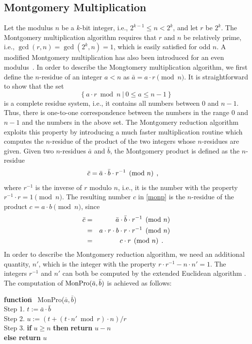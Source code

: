 \documentclass[twocolumn]{svjour3}          %
\begin{document}
\subsection{Montgomery Multiplication}

Let the modulus $n$ be a $k$-bit integer, i.e., $2^{k-1} \leq n < 2^k$,
and let $r$ be $2^k$. The Montgomery multiplication algorithm requires
that $r$ and $n$ be relatively prime, i.e., $\gcd(r,n)=\gcd(2^k,n)=1$,
which is easily satisfied for odd $n$.
A modified Montgomery multiplication has also been introduced for an
even modulus~\cite{K94:Montgomery}.
In order to describe the Mongtomery multiplication algorithm, we first
define the $n$-residue of an integer $a<n$ as
$\bar{a}=a \cdot r \pmod{n}$.
It is straightforward to show that the set
\[
\{~ a \cdot r \bmod{n} ~|~ 0 \leq a \leq n-1 ~\}
\]
is a complete residue system, i.e.,
it contains all numbers between $0$ and $n-1$.
Thus, there is one-to-one correspondence between the numbers in the range
$0$ and $n-1$ and the numbers in the above set. The Montgomery reduction
algorithm exploits this property by introducing a much faster
multiplication routine which computes the $n$-residue of the product of
the two integers whose $n$-residues are given.
Given two $n$-residues $\bar{a}$ and $\bar{b}$,
the Montgomery product is defined as the $n$-residue
%
\begin{equation}
\bar{c}=\bar{a} \cdot \bar{b} \cdot r^{-1} \pmod{n} \label{monp}
\mbox{\hspace*{1ex}\mbox{,}\hspace*{1em}}
\end{equation}
%
where $r^{-1}$ is the inverse of $r$ modulo $n$, i.e., it is the number with
the property $r^{-1} \cdot r = 1 \pmod{n}$.
The resulting number $c$ in \eqref{monp} is
the $n$-residue of the product $c=a \cdot b \pmod{n}$, since
%
\begin{eqnarray*}
\bar{c} & = & \bar{a} \cdot \bar{b} \cdot r^{-1} \pmod{n} \\
        & = & a \cdot r \cdot b \cdot r \cdot r^{-1} \pmod{n} \\
        & = & c \cdot r \pmod{n} \mbox{\hspace*{1ex}\mbox{.}\hspace*{1em}}
\end{eqnarray*}
%
In order to describe the Montgomery reduction algorithm, we need an additional
quantity, $n'$, which is the integer with the property
$r \cdot r^{-1} - n \cdot n' = 1$.
The integers $r^{-1}$ and $n'$ can both be computed by the extended
Euclidean algorithm \cite{K81:Seminumerical,R93:Elementary}.
The computation of $\mbox{MonPro}(\bar{a},\bar{b})$ is achieved as follows:

\begin{tabbing}
\hspace*{.2in}\={\bf function}\= ~MonPro($\bar{a},\bar{b}$)\\
\>Step 1. $t := \bar{a} \cdot \bar{b}$\\
\>Step 2. $u := (t + (t \cdot n' \bmod{r}) \cdot n)/r$\\
\>Step 3. {\bf if} $u \geq n$ {\bf then } 
{\bf return} $u-n$ \\
\> \> {\bf else return} $u$
\end{tabbing}
\end{document}
